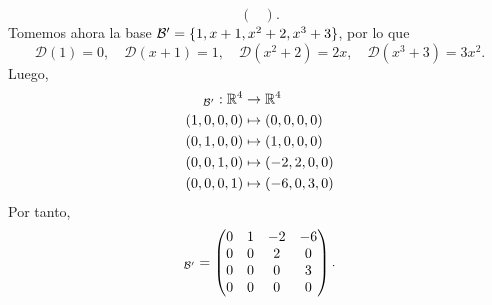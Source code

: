 \documentclass[12pt,a4paper]{book}
\newcommand{\llaves}[1]{\{#1\}}
\begin{document}
\begin{ejemplo}
\begin{equation*}
\begin{pmatrix}
            \end{pmatrix}.
        \end{equation*}
        Tomemos ahora la base $\BB' = \llaves{1, x + 1, x^{2} + 2, x^{3} + 3}$, por lo que
        \begin{equation*}
            \mathcal{D}(1) = 0, \quad \mathcal{D}(x + 1) = 1, \quad \mathcal{D}(x^{2} + 2) = 2x, \quad \mathcal{D}(x^{3} + 3) = 3x^{2}.
        \end{equation*}
        Luego,
        \begin{align*}
            [\mathcal{D}]_{\BB'}: \R^{4} & \to \R^{4}\\
            (1, 0, 0, 0) & \mapsto (0, 0, 0, 0)\\
            (0, 1, 0, 0) & \mapsto (1, 0, 0, 0)\\
            (0, 0, 1, 0) & \mapsto (-2, 2, 0, 0)\\
            (0, 0, 0, 1) & \mapsto (-6, 0, 3, 0)\\
        \end{align*}
        Por tanto,
        \begin{equation*}
            [\mathcal{D}]_{\BB'} = 
            \begin{pmatrix}
                0 & 1 & -2 & -6\\
                0 & 0 & 2 & 0\\
                0 & 0 & 0 & 3\\
                0 & 0 & 0 & 0
            \end{pmatrix}.
        \end{equation*}
    \end{ejemplo}

    \vspace{5cm}
\end{document}
